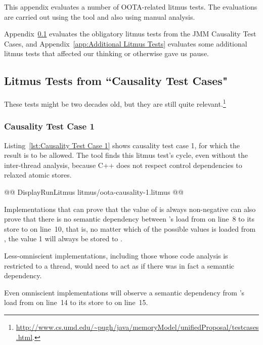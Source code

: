 \documentclass[10]{article}
\begin{document}
This appendix evaluates a number of OOTA-related litmus tests.
The evaluations are carried out using the  tool and also
using manual analysis.

Appendix~\ref{app:Litmus Tests from “Causality Test Cases"}
evaluates the obligatory litmus tests from the JMM Causality Test
Cases, and
Appendix~\ref{app:Additional Litmus Tests}
evaluates some additional litmus tests that affected our thinking or
otherwise gave us pause.

\subsection{Litmus Tests from “Causality Test Cases"}
\label{app:Litmus Tests from “Causality Test Cases"}

These tests might be two decades old, but they are still quite
relevant.\footnote{
	\url{http://www.cs.umd.edu/~pugh/java/memoryModel/unifiedProposal/testcases.html}.}

\subsubsection{Causality Test Case 1}
\label{app:Causality Test Case 1}

Listing~\ref{lst:Causality Test Case 1}
shows causality test case 1, for which the  result
is to be allowed.
The  tool finds this litmus test's cycle, even without the
inter-thread analysis, because C++ does not respect control dependencies
to relaxed atomic stores.

\begin{listing}[tbp]
@@ DisplayRunLitmus litmus/oota-causality-1.litmus @@
\caption{Causality Test Case 1}
\label{lst:Causality Test Case 1}
\end{listing}

Implementations that can prove that the value of  is always
non-negative can also prove that there is no semantic dependency between
's load from  on line~8 to its store to  on line~10,
that is, no matter which of the possible values is loaded from ,
the value 1 will always be stored to .

Less-omniscient implementations, including those whose code analysis
is restricted to a thread, would need to act as if there was in fact a
semantic dependency.

Even omniscient implementations will observe a semantic dependency from
's load from  on line~14 to its store to  on line~15.
\end{document}
